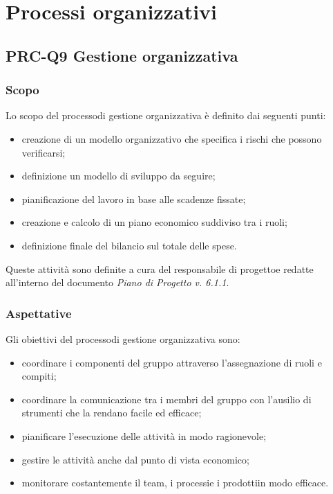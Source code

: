 \section{Processi organizzativi}
	\subsection{PRC-Q9 Gestione organizzativa}
		\subsubsection{Scopo}
			Lo scopo del processo\glosp di gestione organizzativa è definito dai seguenti punti:
			\begin{itemize}
				\item creazione di un modello organizzativo che specifica i rischi che possono verificarsi;
				\item definizione un modello di sviluppo da seguire;
				\item pianificazione del lavoro in base alle scadenze fissate;
				\item creazione e calcolo di un piano economico suddiviso tra i ruoli;
				\item definizione finale del bilancio sul totale delle spese.
			\end{itemize}
			Queste attività sono definite a cura del responsabile di progetto\glosp e redatte all'interno del documento \textit{Piano di Progetto v. 6.1.1}.
		\subsubsection{Aspettative}
			Gli obiettivi del processo\glosp di gestione organizzativa sono:
			\begin{itemize}
				\item coordinare i componenti del gruppo attraverso l'assegnazione di ruoli e compiti;
				\item coordinare la comunicazione tra i membri del gruppo con l'ausilio di strumenti che la rendano facile ed efficace;
				\item pianificare l'esecuzione delle attività in modo ragionevole;
				\item gestire le attività anche dal punto di vista economico;
				\item monitorare costantemente il team, i processi\glosp e i prodotti\glosp in modo efficace.
			\end{itemize}
